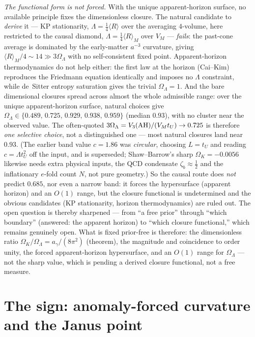 \documentclass[11pt,a4paper]{article}
\theoremstyle{plain}
\theoremstyle{definition}
\theoremstyle{remark}
\newcommand{\Ok}{\Omega_K}
\newcommand{\OL}{\Omega_\Lambda}
\newcommand{\ag}{a_\gamma}
\newcommand{\avg}[1]{\langle #1 \rangle}
\begin{document}
\emph{The functional form is not forced.} With the unique apparent-horizon surface, no
available principle fixes the dimensionless closure. The natural candidate to \emph{derive} it
--- KP stationarity, $\Lambda = \tfrac14\avg{R}$ over the averaging $4$-volume, here restricted
to the causal diamond, $\Lambda = \tfrac14\avg{R}_M$ over $V_M$ --- \emph{fails}: the past-cone
average is dominated by the early-matter $a^{-3}$ curvature, giving $\avg{R}_M/4 \sim 14 \gg 3\OL$
with no self-consistent fixed point. Apparent-horizon thermodynamics do not help either: the
first law at the horizon (Cai--Kim) reproduces the Friedmann equation identically and imposes no
$\Lambda$ constraint, while de~Sitter entropy saturation gives the trivial $\OL=1$. And the bare
dimensional closures spread across almost the whole admissible range: over the unique
apparent-horizon surface, natural choices give $\OL \in \{0.489,\,0.725,\,0.929,\,0.938,\,0.959\}$
(median $0.93$), with no cluster near the observed value. The often-quoted
$3\OL = V_3({\rm AH})/(V_M t_U) \to 0.725$ is therefore \emph{one selective choice}, not a
distinguished one --- most natural closures land near $0.93$. (The earlier band value $c=1.86$ was
\emph{circular}, choosing $L=t_U$ and reading $c=\Lambda t_U^2$ off the input, and is superseded;
Shaw--Barrow's sharp $\Ok=-0.0056$ likewise needs extra physical inputs, the QCD condensate
$\zeta_b\approx\tfrac12$ and the inflationary $e$-fold count $N$, not pure geometry.) So the
causal route does \emph{not} predict $0.685$, nor even a narrow band: it forces the hypersurface
(apparent horizon) and an $O(1)$ range, but the closure functional is undetermined and the
obvious candidates (KP stationarity, horizon thermodynamics) are ruled out. The open question is
thereby sharpened --- from ``a free prior'' through ``which boundary'' (answered: the apparent
horizon) to ``which closure functional,'' which remains genuinely open. What is fixed prior-free
is therefore: the dimensionless ratio $\Ok/\OL = \ag/(8\pi^2)$ (theorem), the magnitude and
coincidence to order unity, the forced apparent-horizon hypersurface, and an $O(1)$ range for
$\OL$ --- not the sharp value, which is pending a derived closure functional, not a free measure.

\section{The sign: anomaly-forced curvature and the Janus point}
\label{sec:sign}
\end{document}
